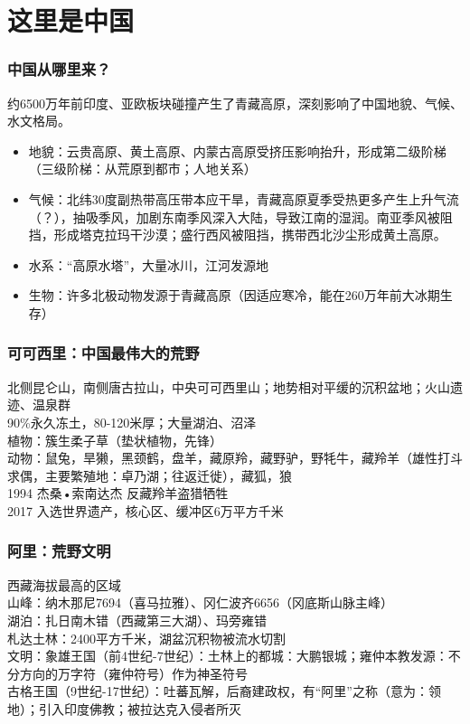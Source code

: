 
\chapter{这里是中国}

\subsection*{中国从哪里来？}

约6500万年前印度、亚欧板块碰撞产生了青藏高原，深刻影响了中国地貌、气候、水文格局。
\begin{itemize}
\item 地貌：云贵高原、黄土高原、内蒙古高原受挤压影响抬升，形成第二级阶梯（三级阶梯：从荒原到都市；人地关系）
\item 气候：北纬30度副热带高压带本应干旱，青藏高原夏季受热更多产生上升气流（？），抽吸季风，加剧东南季风深入大陆，导致江南的湿润。南亚季风被阻挡，形成塔克拉玛干沙漠；盛行西风被阻挡，携带西北沙尘形成黄土高原。
\item 水系：“高原水塔”，大量冰川，江河发源地
\item 生物：许多北极动物发源于青藏高原（因适应寒冷，能在260万年前大冰期生存）
\end{itemize}

\subsection*{可可西里：中国最伟大的荒野}

北侧昆仑山，南侧唐古拉山，中央可可西里山；地势相对平缓的沉积盆地；火山遗迹、温泉群\\
90\%永久冻土，80-120米厚；大量湖泊、沼泽\\
植物：簇生柔子草（垫状植物，先锋）\\
动物：鼠兔，旱獭，黑颈鹤，盘羊，藏原羚，藏野驴，野牦牛，藏羚羊（雄性打斗求偶，主要繁殖地：卓乃湖；往返迁徙），藏狐，狼\\
1994 杰桑•索南达杰 反藏羚羊盗猎牺牲\\
2017 入选世界遗产，核心区、缓冲区6万平方千米

\subsection*{阿里：荒野文明}

西藏海拔最高的区域\\
山峰：纳木那尼7694（喜马拉雅）、冈仁波齐6656（冈底斯山脉主峰）\\
湖泊：扎日南木错（西藏第三大湖）、玛旁雍错\\
札达土林：2400平方千米，湖盆沉积物被流水切割\\
文明：象雄王国（前4世纪-7世纪）：土林上的都城：大鹏银城；雍仲本教发源：不分方向的万字符（雍仲符号）作为神圣符号\\
古格王国（9世纪-17世纪）：吐蕃瓦解，后裔建政权，有“阿里”之称（意为：领地）；引入印度佛教；被拉达克入侵者所灭

